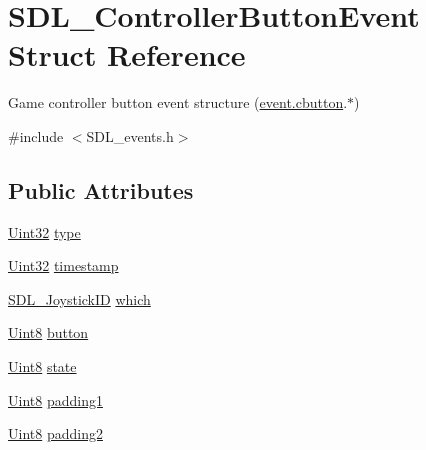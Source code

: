 \hypertarget{struct_s_d_l___controller_button_event}{}\section{S\+D\+L\+\_\+\+Controller\+Button\+Event Struct Reference}
\label{struct_s_d_l___controller_button_event}


Game controller button event structure (\hyperlink{union_s_d_l___event_aee2b5671c8dcdb447023715cc21593cb}{event.\+cbutton}.$\ast$)  




{\ttfamily \#include $<$S\+D\+L\+\_\+events.\+h$>$}

\subsection*{Public Attributes}
\begin{DoxyCompactItemize}
\item 
\hyperlink{_s_d_l__stdinc_8h_add440eff171ea5f55cb00c4a9ab8672d}{Uint32} \hyperlink{struct_s_d_l___controller_button_event_a09869d792031e47a88673d85915c209f}{type}
\item 
\hyperlink{_s_d_l__stdinc_8h_add440eff171ea5f55cb00c4a9ab8672d}{Uint32} \hyperlink{struct_s_d_l___controller_button_event_a73003712734c4d2f966db3d7c2ce826b}{timestamp}
\item 
\hyperlink{_s_d_l__joystick_8h_a3c3d32500cb08f76ee8077983912c0bd}{S\+D\+L\+\_\+\+Joystick\+ID} \hyperlink{struct_s_d_l___controller_button_event_a98777e88b5d5cae83eef16ffd4bcacc1}{which}
\item 
\hyperlink{_s_d_l__stdinc_8h_a2944638813a090aa23e62f4da842c3e2}{Uint8} \hyperlink{struct_s_d_l___controller_button_event_a039da6cd31c3c62e62a3ae17cc64d0db}{button}
\item 
\hyperlink{_s_d_l__stdinc_8h_a2944638813a090aa23e62f4da842c3e2}{Uint8} \hyperlink{struct_s_d_l___controller_button_event_a00c46683f86674c2a4f74404ee3e857c}{state}
\item 
\hyperlink{_s_d_l__stdinc_8h_a2944638813a090aa23e62f4da842c3e2}{Uint8} \hyperlink{struct_s_d_l___controller_button_event_a34d3e43fc1994288b9b083c874bc0899}{padding1}
\item 
\hyperlink{_s_d_l__stdinc_8h_a2944638813a090aa23e62f4da842c3e2}{Uint8} \hyperlink{struct_s_d_l___controller_button_event_a8caf56a3921227913cfb652d5de1eec4}{padding2}
\end{DoxyCompactItemize}


